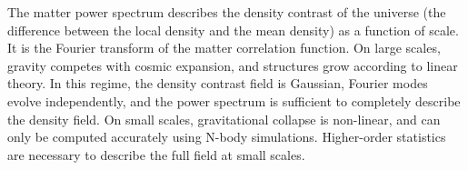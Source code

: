 \begin{description}
\item The matter power spectrum describes the density contrast of the universe (the difference between the local density and the mean density) as a function of scale. It is the Fourier transform of the matter correlation function. On large scales, gravity competes with cosmic expansion, and structures grow according to linear theory. In this regime, the density contrast field is Gaussian, Fourier modes evolve independently, and the power spectrum is sufficient to completely describe the density field. On small scales, gravitational collapse is non-linear, and can only be computed accurately using N-body simulations. Higher-order statistics are necessary to describe the full field at small scales.

\item[The Story of structure formation so far, important bits]


\end{description}
